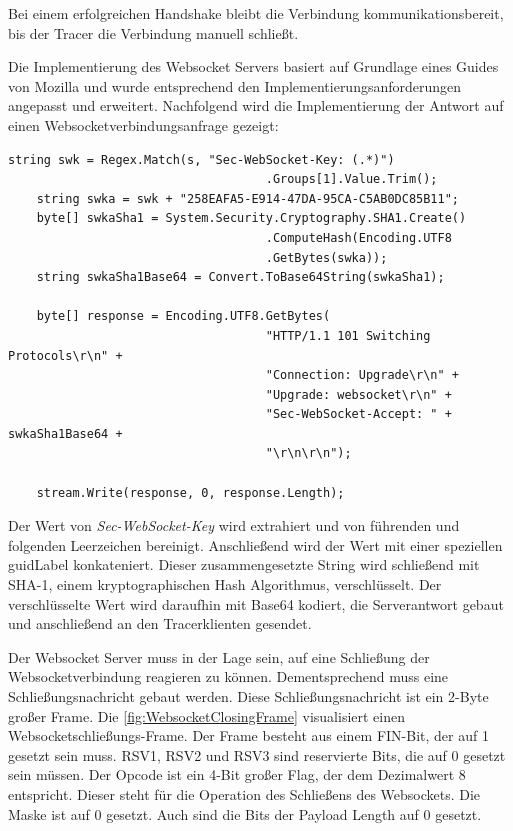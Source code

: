 Bei einem erfolgreichen Handshake bleibt die Verbindung kommunikationsbereit, bis der Tracer die Verbindung manuell schließt.

Die Implementierung des Websocket Servers basiert auf Grundlage eines Guides von Mozilla und wurde entsprechend den Implementierungsanforderungen angepasst und erweitert. Nachfolgend wird die Implementierung der Antwort auf einen Websocketverbindungsanfrage gezeigt:

\begin{minipage}[]{\textwidth}
	\begin{lstlisting}[frame=trBL]
	string swk = Regex.Match(s, "Sec-WebSocket-Key: (.*)")
									.Groups[1].Value.Trim();
	string swka = swk + "258EAFA5-E914-47DA-95CA-C5AB0DC85B11";
	byte[] swkaSha1 = System.Security.Cryptography.SHA1.Create()
									.ComputeHash(Encoding.UTF8
									.GetBytes(swka));
	string swkaSha1Base64 = Convert.ToBase64String(swkaSha1);
	
	byte[] response = Encoding.UTF8.GetBytes(
									"HTTP/1.1 101 Switching Protocols\r\n" +
									"Connection: Upgrade\r\n" +
									"Upgrade: websocket\r\n" +
									"Sec-WebSocket-Accept: " + swkaSha1Base64 +
									"\r\n\r\n");
	
	stream.Write(response, 0, response.Length);
	\end{lstlisting}
	\label{listing:Implementierung der Serverantwort eines Websocket Handshake}
\end{minipage}

Der Wert von \emph{Sec-WebSocket-Key} wird extrahiert und von führenden und folgenden Leerzeichen bereinigt. Anschließend wird der Wert mit einer speziellen \gls{guidLabel} konkateniert. Dieser zusammengesetzte String wird schließend mit SHA-1, einem kryptographischen Hash Algorithmus, verschlüsselt. Der verschlüsselte Wert wird daraufhin mit Base64 kodiert, die Serverantwort gebaut und anschließend an den Tracerklienten gesendet.

Der Websocket Server muss in der Lage sein, auf eine Schließung der Websocketverbindung reagieren zu können. Dementsprechend muss eine Schließungsnachricht gebaut werden.
Diese Schließungsnachricht ist ein 2-Byte großer Frame. Die \cref{fig:WebsocketClosingFrame} visualisiert einen Websocketschließungs-Frame. Der Frame besteht aus einem FIN-Bit, der auf 1 gesetzt sein muss. RSV1, RSV2 und RSV3 sind reservierte Bits, die auf 0 gesetzt sein müssen. Der Opcode ist ein 4-Bit großer Flag, der dem Dezimalwert 8 entspricht. Dieser steht für die Operation des Schließens des Websockets. Die Maske ist auf 0 gesetzt. Auch sind die Bits der Payload Length auf 0 gesetzt. 

